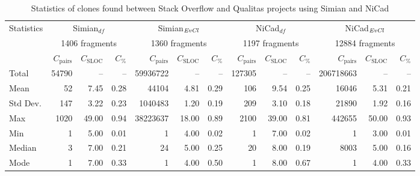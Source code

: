 \documentclass{sig-alternate-05-2015}
\begin{document}
\begin{table}[h]
	\centering
	\caption{Statistics of clones found between Stack Overflow and Qualitas projects using Simian and NiCad}
	\label{t_simian_raw_results}
	\small
		\begin{tabular}{l|r|r|r|r|r|r|r|r|r|r|r|r}
			\hline
			\multirow{3}{*}{Statistics} 
			& \multicolumn{3}{c|}{Simian$_{df}$} 
			& \multicolumn{3}{c|}{Simian$_{\textrm{\textit{EvCl}}}$}
			& \multicolumn{3}{c|}{NiCad$_{df}$} 
			& \multicolumn{3}{c}{NiCad$_{\textrm{\textit{EvCl}}}$} \\ \cline{2-13} 
			& \multicolumn{3}{c|}{1406 fragments} 
			& \multicolumn{3}{c|}{1360 fragments}  
			& \multicolumn{3}{c|}{1197 fragments} 
			& \multicolumn{3}{c}{12884 fragments} \\ \cline{2-13}
			& $C_{\mathrm{pairs}}$ & $C_{\mathrm{SLOC}}$ & $C_{\mathrm{\%}}$ 
			& $C_{\mathrm{pairs}}$ & $C_{\mathrm{SLOC}}$ & $C_{\mathrm{\%}}$ 
			& $C_{\mathrm{pairs}}$ & $C_{\mathrm{SLOC}}$ & $C_{\mathrm{\%}}$
			& $C_{\mathrm{pairs}}$ & $C_{\mathrm{SLOC}}$ & $C_{\mathrm{\%}}$ \\ 
			\hline
			Total & 54790 & -- & -- 		& 59936722 & --	& -- 		& 127305 	& -- & -- 	& 206718663 & -- & -- \\
			Mean & 52 & 7.45 & 0.28 		& 44104 & 4.81 & 0.29 		& 106 & 9.54 & 0.25 	& 16046 & 5.31 & 0.21 \\
			Std Dev. & 147 & 3.22 & 0.23 	& 1040483 & 1.20 & 0.19 	& 209 & 3.10 & 0.18 	& 21890 & 1.92 & 0.16 \\
			Max  & 1020 & 49.00 & 0.94 		& 38223637 & 18.00 & 0.89 	& 2100 & 39.00 & 0.81 	& 442655 & 50.00 & 0.93 \\
			Min  & 1 & 5.00 & 0.01 			& 1 & 4.00 & 0.02 			& 1 & 7.00 & 0.02 		& 1 & 3.00 & 0.01 \\
			Median  & 3 & 7.00 & 0.21 		& 24 & 5.00 & 0.25 			& 20 & 8.00 & 0.19 		& 8003 & 5.00 	& 0.16 \\
			Mode  & 1 & 7.00 & 0.33 		& 1 & 4.00 & 0.50 			& 1 & 8.00 & 0.67 		& 1 & 4.00 & 0.33 \\
			\hline
		\end{tabular} %
\end{table}
\end{document}
